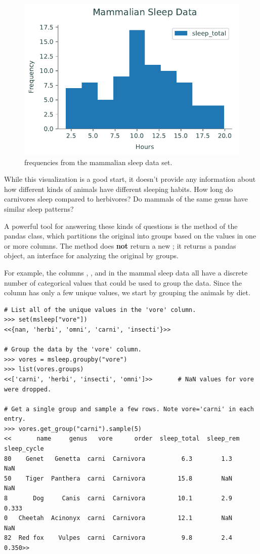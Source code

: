 \begin{figure}[H] %
    \centering
    \includegraphics[width=.7\textwidth]{figures/mammal_hist.pdf}
    \caption{ frequencies from the mammalian sleep data set.}
    \label{fig:pandas-mammals-sleep-all}
\end{figure}

While this visualization is a good start, it doesn't provide any information about how different kinds of animals have different sleeping habits.
How long do carnivores sleep compared to herbivores?
Do mammals of the same genus have similar sleep patterns?

A powerful tool for answering these kinds of questions is the  method of the pandas  class, which partitions the original  into groups based on the values in one or more columns.
The  method does \textbf{not} return a new ; it returns a pandas  object, an interface for analyzing the original  by groups.

For example, the columns , , and  in the mammal sleep data all have a discrete number of categorical values that could be used to group the data.
Since the  column has only a few unique values, we start by grouping the animals by diet.

\begin{lstlisting}
# List all of the unique values in the 'vore' column.
>>> set(msleep["vore"])
<<{nan, 'herbi', 'omni', 'carni', 'insecti'}>>

# Group the data by the 'vore' column.
>>> vores = msleep.groupby("vore")
>>> list(vores.groups)
<<['carni', 'herbi', 'insecti', 'omni']>>       # NaN values for vore were dropped.

# Get a single group and sample a few rows. Note vore='carni' in each entry.
>>> vores.get_group("carni").sample(5)
<<       name     genus   vore      order  sleep_total  sleep_rem  sleep_cycle
80    Genet   Genetta  carni  Carnivora          6.3        1.3          NaN
50    Tiger  Panthera  carni  Carnivora         15.8        NaN          NaN
8       Dog     Canis  carni  Carnivora         10.1        2.9        0.333
0   Cheetah  Acinonyx  carni  Carnivora         12.1        NaN          NaN
82  Red fox    Vulpes  carni  Carnivora          9.8        2.4        0.350>>
\end{lstlisting}

